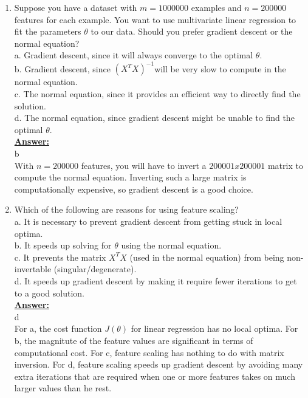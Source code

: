 \documentclass{article}
\newenvironment{qparts}{\begin{enumerate}[1.]}{\end{enumerate}}
\begin{document}
\begin{qparts}
\item Suppose you have a dataset with $m = 1000000$ examples and $n = 200000$ features for each example. You want to use multivariate linear regression to fit the parameters $\theta$ to our data. Should you prefer gradient descent or the normal equation?\\
a. Gradient descent, since it will always converge to the optimal $\theta$.\\
b. Gradient descent, since $(X^T X)^{-1} $will be very slow to compute in the normal equation.\\
c. The normal equation, since it provides an efficient way to directly find the solution.\\
d. The normal equation, since gradient descent might be unable to find the optimal $\theta$.\\
\underline{\textbf{Answer:}}\\
b\\
With $n = 200000$ features, you will have to invert a $200001 x 200001$ matrix to compute the normal equation. Inverting such a large matrix is computationally expensive, so gradient descent is a good choice.
 
 \item Which of the following are reasons for using feature scaling?\\
a. It is necessary to prevent gradient descent from getting stuck in local optima.\\
b. It speeds up solving for $\theta$ using the normal equation.\\
c. It prevents the matrix $X^T X$ (used in the normal equation) from being non-invertable (singular/degenerate).\\
d. It speeds up gradient descent by making it require fewer iterations to get to a good solution.\\
\underline{\textbf{Answer:}}\\
d\\
For a, the cost function $J(\theta)$ for linear regression has no local optima. For b, the magnitute of the feature values are significant in terms of computational cost. For c, feature scaling has nothing to do with matrix inversion. For d, feature scaling speeds up gradient descent by avoiding many extra iterations that are required when one or more features takes on much larger values than he rest.
 
\end{qparts}


\newpage
\end{document}
